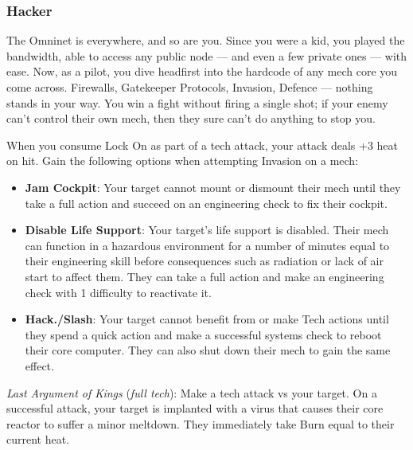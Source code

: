 \subsubsection{Hacker}

\begin{talent}
{The Omninet is everywhere, and so are you. Since you were a kid, you played the bandwidth, able to access any public node — and even a few private ones — with ease. Now, as a pilot, you dive headfirst into the hardcode of any mech core you come across. Firewalls, Gatekeeper Protocols, Invasion, Defence — nothing stands in your way. You win a fight without firing a single shot; if your enemy can’t control their own mech, then they sure can’t do anything to stop you.}

When you consume Lock On as part of a tech attack, your attack deals +3 heat on hit. 
Gain the following options when attempting Invasion on a mech: 
\begin{itemize}
\item \textbf{Jam Cockpit}: Your target cannot mount or dismount their mech until they take a full action and succeed on an engineering check to fix their cockpit.
\item \textbf{Disable Life Support}: Your target’s life support is disabled. Their mech can function in a hazardous environment for a number of minutes equal to their engineering skill before consequences such as radiation or lack of air start to affect them. They can take a full action and make an engineering check with 1 difficulty to reactivate it.
\item \textbf{Hack./Slash}: Your target cannot benefit from or make Tech actions until they spend a quick action and make a successful systems check to reboot their core computer. They can also shut down their mech to gain the same effect.
\end{itemize}
\textit{Last Argument of Kings} (\textit{full tech}): Make a tech attack vs your target. On a successful attack, your target is implanted with a virus that causes their core reactor to suffer a minor meltdown. They immediately take Burn equal to their current heat.
\end{talent}
